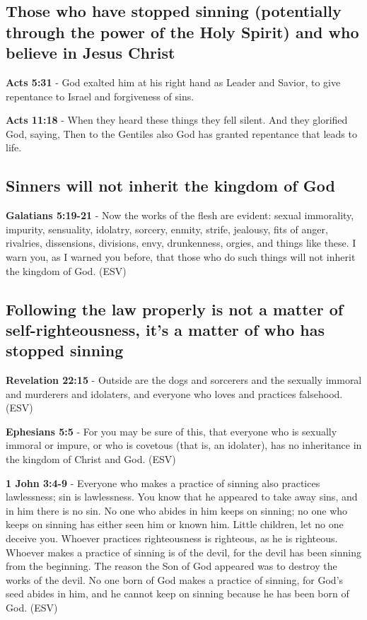 \documentclass[11pt]{article}
\begin{document}
\subsection{Those who have stopped sinning (potentially through the power of the Holy Spirit) and who believe in Jesus Christ}
\label{sec:orgddc6a55}
\textbf{Acts 5:31} - God exalted him at his right hand as Leader and Savior, to give repentance to Israel and forgiveness of sins.

\textbf{Acts 11:18} - When they heard these things they fell silent. And they glorified God, saying, Then to the Gentiles also God has granted repentance that leads to life.

\subsection{Sinners will not inherit the kingdom of God}
\label{sec:orga485031}
\textbf{Galatians 5:19-21} -  Now the works of the flesh are evident: sexual immorality, impurity, sensuality, idolatry, sorcery, enmity, strife, jealousy, fits of anger, rivalries, dissensions, divisions, envy, drunkenness, orgies, and things like these.  I warn you, as I warned you before, that those who do such things will not inherit the kingdom of God.  (ESV)

\subsection{Following the law properly is not a matter of self-righteousness, it's a matter of who has stopped sinning}
\label{sec:org6865d5b}
\textbf{Revelation 22:15} -  Outside are the dogs and sorcerers and the sexually immoral and murderers and idolaters, and everyone who loves and practices falsehood.  (ESV)

\textbf{Ephesians 5:5} -  For you may be sure of this, that everyone who is sexually immoral or impure, or who is covetous (that is, an idolater), has no inheritance in the kingdom of Christ and God.  (ESV)

\textbf{1 John 3:4-9} -  Everyone who makes a practice of sinning also practices lawlessness; sin is lawlessness.  You know that he appeared to take away sins, and in him there is no sin.  No one who abides in him keeps on sinning; no one who keeps on sinning has either seen him or known him.  Little children, let no one deceive you.  Whoever practices righteousness is righteous, as he is righteous.  Whoever makes a practice of sinning is of the devil, for the devil has been sinning from the beginning.  The reason the Son of God appeared was to destroy the works of the devil.  No one born of God makes a practice of sinning, for God's seed abides in him, and he cannot keep on sinning because he has been born of God.  (ESV)
\end{document}
